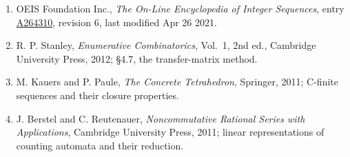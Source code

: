 \documentclass[11pt]{article}
\theoremstyle{definition}
\begin{document}
\begin{enumerate}

\item OEIS Foundation Inc., \emph{The On-Line Encyclopedia of Integer Sequences}, entry \href{https://oeis.org/A264310}{A264310}, revision 6, last modified Apr 26 2021.

\item R. P. Stanley, \emph{Enumerative Combinatorics}, Vol.~1, 2nd ed., Cambridge University Press, 2012; \S4.7, the transfer-matrix method.

\item M. Kauers and P. Paule, \emph{The Concrete Tetrahedron}, Springer, 2011; C-finite sequences and their closure properties.

\item J. Berstel and C. Reutenauer, \emph{Noncommutative Rational Series with Applications}, Cambridge University Press, 2011; linear representations of counting automata and their reduction.

\end{enumerate}
\end{document}
